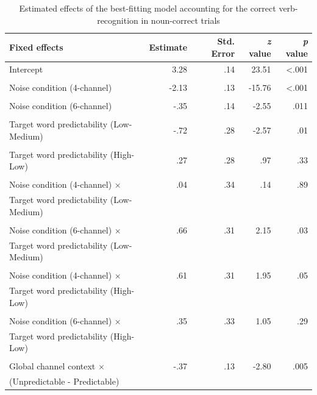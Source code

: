 \documentclass[a4paper, nobind]{templates/ociamthesis}
\begin{document}
\begin{table}[h]
\begin{center}
\caption{Estimated effects of the best-fitting model accounting for the correct verb-recognition in noun-correct trials}
\label{gradedcomplementary1} 
\vskip 0.12in
\begin{tabular}[]{@{}lrrrr@{}}
\toprule
Fixed effects & Estimate & Std. Error & \emph{z} value & \emph{p}
value \\
\midrule
Intercept & 3.28 & .14 & 23.51 & \textless.001 \\
\\
Noise condition (4-channel) & -2.13 & .13 & -15.76 & \textless.001 \\
\\
Noise condition (6-channel) & -.35 & .14 & -2.55 & .011 \\
\\
Target word predictability (Low-Medium) & -.72 & .28 & -2.57 & .01 \\
\\
Target word predictability (High-Low) & .27 & .28 & .97 & .33 \\
\\
Noise condition (4-channel) $\times$ & .04 & .34 & .14 & .89 \\
Target word predictability (Low-Medium) \\
\\
Noise condition (6-channel) $\times$ & .66 & .31 & 2.15 & .03 \\
Target word predictability (Low-Medium) \\
\\
Noise condition (4-channel) $\times$ & .61 & .31 & 1.95 & .05 \\
Target word predictability (High-Low) \\
\\
Noise condition (6-channel) $\times$ & .35 & .33 & 1.05 & .29 \\
Target word predictability (High-Low) \\
\\
Global channel context $\times$ & -.37 & .13 & -2.80 & .005 \\
(Unpredictable - Predictable) \\
\bottomrule
\end{tabular} 
\end{center} 
\end{table}
\end{document}
